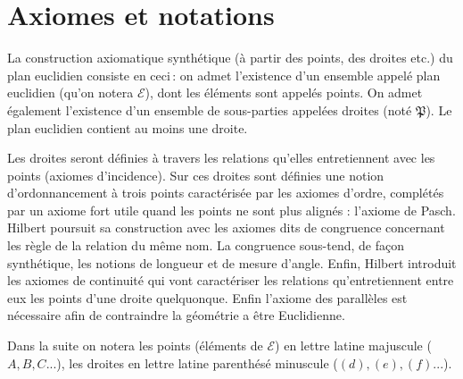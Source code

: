 
        \section{Axiomes et notations}


\begin{notion}
La construction axiomatique synthétique (à partir des points, des droites etc.) du plan euclidien consiste en ceci\,: on admet l'existence d'un ensemble appelé plan euclidien (qu'on notera $\mathcal{E}$), dont les éléments sont appelés points. On admet également l'existence d'un ensemble de sous-parties appelées droites (noté $\mathfrak{P}$). Le plan euclidien contient au moins une droite. 
\end{notion}

Les droites seront définies à travers les relations qu'elles entretiennent avec les points (axiomes d'incidence). Sur ces droites sont définies une notion d'ordonnancement à trois points caractérisée par les axiomes d'ordre, complétés par un axiome fort utile quand les points ne sont plus alignés : l'axiome de Pasch. Hilbert poursuit sa construction avec les axiomes dits de congruence concernant les règle de la relation du même nom. La congruence sous-tend, de façon synthétique, les notions de longueur et de mesure d'angle. Enfin, Hilbert introduit les axiomes de continuité qui vont caractériser les relations qu'entretiennent entre eux les points d'une droite quelquonque. Enfin l'axiome des parallèles est nécessaire afin de contraindre la géométrie a être Euclidienne. 



Dans la suite on notera les points (éléments de $\mathcal{E}$) en lettre latine majuscule ($A,B,C...$), les droites en lettre latine parenthésé minuscule ($(d),(e),(f)...$). 


